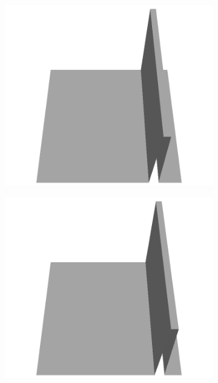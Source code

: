 \documentclass[../document.tex]{subfiles}
\begin{document}
\begin{figure}
\begin{subfigure}[b]{0.160\textwidth}
    \includegraphics[width=\linewidth]{../img/5/custom_patches/walls_front/all/25-3d.png}
    \end{subfigure}
    \begin{subfigure}[b]{0.160\textwidth}
    \includegraphics[width=\linewidth]{../img/5/custom_patches/walls_front/all/20-3d.png}
    \end{subfigure}
    \begin{subfigure}[b]{0.160\textwidth}

\end{subfigure}
\end{figure}
\end{document}
